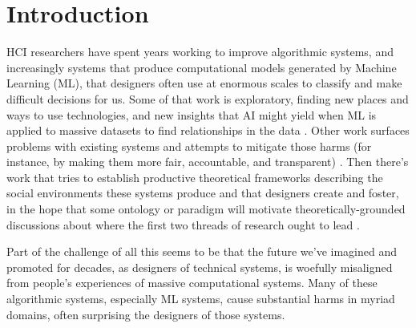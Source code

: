 \documentclass[manuscript,screen]{acmart}
\begin{document}
\maketitle



\section{Introduction}

HCI researchers have spent years working to improve algorithmic systems, and increasingly systems that produce computational models generated by Machine Learning (ML), that designers often use at enormous scales to classify and make difficult decisions for us.
Some of that work is exploratory, finding new places and ways to use technologies, and new insights that AI might yield when ML is applied to massive datasets to find relationships in the data
\cite{10.1145/3170427.3174367,10.1145/3290607.3312948,Yang:2019:UAF:3290605.3300468}.
Other work surfaces problems with existing systems and attempts to mitigate those harms (for instance, by making them more fair, accountable, and transparent)
\cite{Amershi:2019:GHI:3290605.3300233,Jakesch:2019:ACP:3290605.3300469,10.1145/3290605.3300863,Kocielnik:2019:YAI:3290605.3300641,10.1145/3313831.3376590}.
Then there's work that tries to establish productive theoretical frameworks describing the social environments these systems produce and that designers create and foster, in the hope that some ontology or paradigm will motivate theoretically-grounded discussions about where the first two threads of research ought to lead
\cite{Eslami:2018:CAP:3173574.3174006,Eslami:2015:IAA:2702123.2702556,Eslami:2019:UAT:3290605.3300724,10.1145/2559206.2578883,10.1145/2998181.2998321,10.1145/3173574.3173590}.


Part of the challenge of all this seems to be that the future we've imagined and promoted for decades, as designers of technical systems, is woefully misaligned from people's experiences of massive computational systems.
Many of these algorithmic systems, especially ML systems, cause substantial harms in myriad domains, often surprising the designers of those systems.
\end{document}
